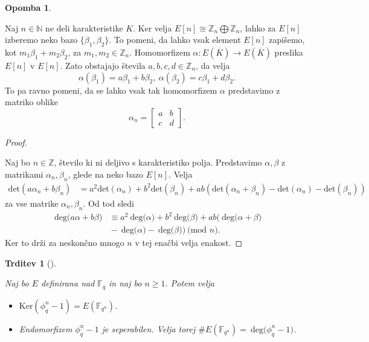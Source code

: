 \documentclass[12pt,a4paper,twoside]{article}
\theoremstyle{definition} %
\newtheorem{opomba}[definicija]{Opomba}
\theoremstyle{plain} %
\newtheorem{trditev}[definicija]{Trditev}
\numberwithin{equation}{section}  %
\newcommand{\N}{\mathbb N}
\newcommand{\Z}{\mathbb Z}
\newcommand{\F}{\mathbb F}
\newcommand{\E}[1]{E({#1})}
\newcommand{\MOD}[1]{\ \text{(mod }{#1}\text{)}}
\newcommand{\DEG}[1]{\ \text{deg(}{#1}\text{)}}
\begin{document}
\begin{opomba}~

Naj $n \in \N$ ne deli karakteristike $K$. Ker velja $E[n] \cong \Z_n \bigoplus \Z_n$, lahko za $E[n]$ izberemo neko bazo $\{ \beta_1, \beta_2\}$. To pomeni, da lahko vsak element $E[n]$ zapišemo, kot $m_1\beta_1 + m_2\beta_2$, za $m_1, m_2 \in \Z_n$. Homomorfizem $\alpha: \E{\overline{K}} \rightarrow \E{\overline{K}}$ preslika $E[n]$ v $E[n]$. Zato obstajajo števila $a,b,c,d \in \Z_n$, da velja
$$\alpha(\beta_1) = a\beta_1+b\beta_2, \ \alpha(\beta_2) = c\beta_1+d\beta_2.$$
To pa ravno pomeni, da se lahko vsak tak homomorfizem $\alpha$ predstavimo z matriko oblike
$$\alpha_n = \begin{bmatrix}
a & b \\
c & d
\end{bmatrix}.$$
\end{opomba}

\begin{proof}~

Naj bo $n \in \Z$, število ki ni deljivo s karakteristiko polja. Predstavimo $\alpha,\beta$ z matrikami $\alpha_n,\beta_n$, glede na neko bazo $E[n]$.
Velja
\begin{align}
\text{det}(a\alpha_n+b\beta_n) &{}=  a^2\text{det}(\alpha_n)+b^2\text{det}(\beta_n) + ab(\text{det}(\alpha_n+\beta_n)-\text{det}(\alpha_n)-\text{det}(\beta_n)) \nonumber
\end{align}
za vse matrike $\alpha_n,\beta_n$.
Od tod sledi
\begin{align}
\DEG{a\alpha+b\beta} &{}\equiv a^2\DEG{\alpha}+b^2\DEG{\beta} + ab(\DEG{\alpha+\beta} \nonumber \\
&{}-\DEG{\alpha}-\DEG{\beta}) \MOD{n}. \nonumber
\end{align}
Ker to drži za neskončno mnogo $n$ v tej enačbi velja enakost.


\end{proof}

\begin{trditev}[]~

\label{trd:4.7}
Naj bo $E$ definirana nad $\F_q$ in naj bo $n \geq 1$. Potem velja
\begin{itemize}
\item $\text{Ker}(\phi^n_q-1) = \E{\F_{q^n}}$.
\item Endomorfizem $\phi^n_q-1$ je seperabilen. Velja torej $\#\E{\F_{q^n}} = \DEG{\phi^n_q-1}$.
\end{itemize}
\end{trditev}
\end{document}
